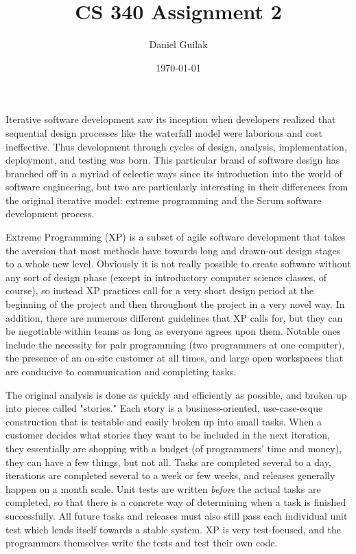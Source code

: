 \documentclass[12pt, letterpaper]{article}
\begin{document}
\title{CS 340 Assignment 2}
\author{Daniel Guilak}
\date{\today}
\maketitle

Iterative software development saw its inception when developers realized that sequential design processes like the waterfall model were laborious and cost ineffective. Thus development through cycles of design, analysis, implementation, deployment, and testing was born. This particular brand of software design has branched off in a myriad of eclectic ways since its introduction into the world of software engineering, but two are particularly interesting in their differences from the original iterative model: extreme programming and the Scrum software development process.

Extreme Programming \cite{beck99} (XP) is a subset of agile software development that takes the aversion that most methods have towards long and drawn-out design stages to a whole new level. Obviously it is not really possible to create software without any sort of design phase (except in introductory computer science classes, of course), so instead XP practices call for a very short design period at the beginning of the project and then throughout the project in a very novel way.
In addition, there are numerous different guidelines that XP calls for, but they can be negotiable within teams as long as everyone agrees upon them. Notable ones include the necessity for pair programming (two programmers at one computer), the presence of an on-site customer at all times, and large open workspaces that are conducive to communication and completing tasks.

The original analysis is done as quickly and efficiently as possible, and broken up into pieces called "stories." Each story is a business-oriented, use-case-esque construction that is testable and easily broken up into small tasks. When a customer decides what stories they want to be included in the next iteration, they essentially are shopping with a budget (of programmers' time and money), they can have a few things, but not all.
Tasks are completed several to a day, iterations are completed several to a week or few weeks, and releases generally happen on a month scale.
Unit tests are written \emph{before} the actual tasks are completed, so that there is a concrete way of determining when a task is finished successfully. All future tasks and releases must also still pass each individual unit test which lends itself towards a stable system.
XP is very test-focused, and the programmers themselves write the tests and test their own code.
\end{document}
